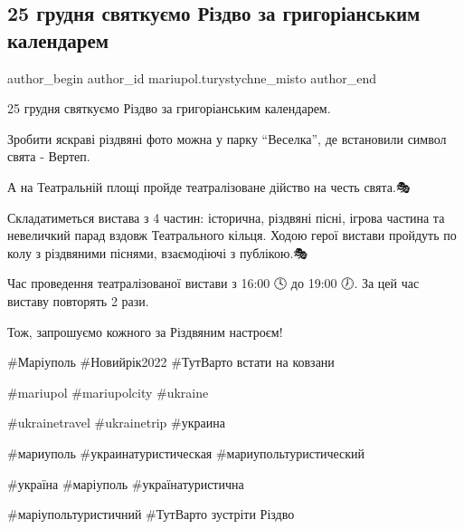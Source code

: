  
 
 
 
 

\subsection{25 грудня святкуємо Різдво за григоріанським календарем}
\label{sec:24_12_2021.fb.mariupol.turystychne_misto.2.25_grudnja_svjatkuemo_rizdvo_grigorianskii_kalendar}

\ifcmt
 author_begin
   author_id mariupol.turystychne_misto
 author_end
\fi

25 грудня святкуємо Різдво за григоріанським календарем. 🌟📆

Зробити яскраві різдвяні фото можна у парку \enquote{Веселка}, де встановили
символ свята - Вертеп.🤱

А на Театральній площі пройде театралізоване дійство на честь свята.🎭

Складатиметься вистава з 4 частин: історична, різдвяні пісні, ігрова частина та
невеличкий парад вздовж Театрального кільця. Ходою герої вистави пройдуть по
колу з різдвяними піснями, взаємодіючі з публікою.🎭

Час проведення театралізованої вистави з 16:00  🕓  до 19:00 🕖.  За цей час виставу повторять 2 рази.

Тож, запрошуємо кожного за Різдвяним настроєм!🤗

\#Маріуполь \#Новийрік2022 \#ТутВарто встати на ковзани 

\#mariupol \#mariupolcity \#ukraine 

\#ukrainetravel \#ukrainetrip \#украина  

\#мариуполь \#украинатуристическая \#мариупольтуристический  

\#україна \#маріуполь \#українатуристична 

\#маріупольтуристичний \#ТутВарто зустріти Різдво
